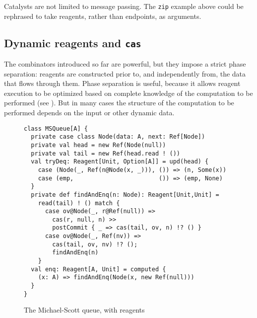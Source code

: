 \documentclass[preprint]{sigplanconf}
\begin{document}
Catalysts are not limited to message passing.  The \lstinline{zip} example
above could be rephrased to take reagents, rather than endpoints, as
arguments.  



\subsection{Dynamic reagents and \lstinline{cas}}

The combinators introduced so far are powerful, but they impose a strict phase
separation: reagents are constructed prior to, and independently from, the
data that flows through them.  Phase separation is useful, because it allows
reagent execution to be optimized based on complete knowledge of the
computation to be performed (see ).  But in many cases
the structure of the computation to be performed depends on the input or other
dynamic data.

\begin{figure}
\begin{lstlisting}
class MSQueue[A] {
  private case class Node(data: A, next: Ref[Node])
  private val head = new Ref(Node(null))
  private val tail = new Ref(head.read ! ())
  val tryDeq: Reagent[Unit, Option[A]] = upd(head) {
    case (Node(_, Ref(n@Node(x, _))), ()) => (n, Some(x))
    case (emp,                        ()) => (emp, None)
  }
  private def findAndEnq(n: Node): Reagent[Unit,Unit] = 
    read(tail) ! () match {
      case ov@Node(_, r@Ref(null)) => 
        cas(r, null, n) >>
        postCommit { _ => cas(tail, ov, n) !? () }
      case ov@Node(_, Ref(nv)) => 
        cas(tail, ov, nv) !? (); 
        findAndEnq(n)
    }
  val enq: Reagent[A, Unit] = computed { 
    (x: A) => findAndEnq(Node(x, new Ref(null)))
  }
}
\end{lstlisting}
\nocaptionrule
\caption{The Michael-Scott queue, with reagents}
\label{fig:msqueue}
\end{figure}
\end{document}
